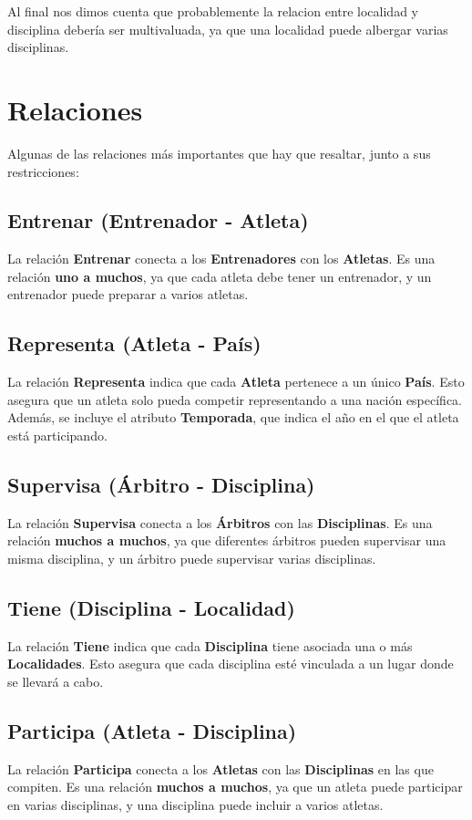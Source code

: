 Al final nos dimos cuenta que probablemente la relacion entre localidad y disciplina debería ser multivaluada, ya que una localidad puede albergar varias disciplinas.

\section*{Relaciones}

Algunas de las relaciones más importantes que hay que resaltar, junto a sus restricciones:

\subsection*{Entrenar (Entrenador - Atleta)}
La relación \textbf{Entrenar} conecta a los \textbf{Entrenadores} con los \textbf{Atletas}. Es una relación \textbf{uno a muchos}, ya que cada atleta debe tener un entrenador, y un entrenador puede preparar a varios atletas.

\subsection*{Representa (Atleta - País)}
La relación \textbf{Representa} indica que cada \textbf{Atleta} pertenece a un único \textbf{País}. Esto asegura que un atleta solo pueda competir representando a una nación específica. Además, se incluye el atributo \textbf{Temporada}, que indica el año en el que el atleta está participando.

\subsection*{Supervisa (Árbitro - Disciplina)}
La relación \textbf{Supervisa} conecta a los \textbf{Árbitros} con las \textbf{Disciplinas}. Es una relación \textbf{muchos a muchos}, ya que diferentes árbitros pueden supervisar una misma disciplina, y un árbitro puede supervisar varias disciplinas.

\subsection*{Tiene (Disciplina - Localidad)}
La relación \textbf{Tiene} indica que cada \textbf{Disciplina} tiene asociada una o más \textbf{Localidades}. Esto asegura que cada disciplina esté vinculada a un lugar donde se llevará a cabo.

\subsection*{Participa (Atleta - Disciplina)}
La relación \textbf{Participa} conecta a los \textbf{Atletas} con las \textbf{Disciplinas} en las que compiten. Es una relación \textbf{muchos a muchos}, ya que un atleta puede participar en varias disciplinas, y una disciplina puede incluir a varios atletas.

